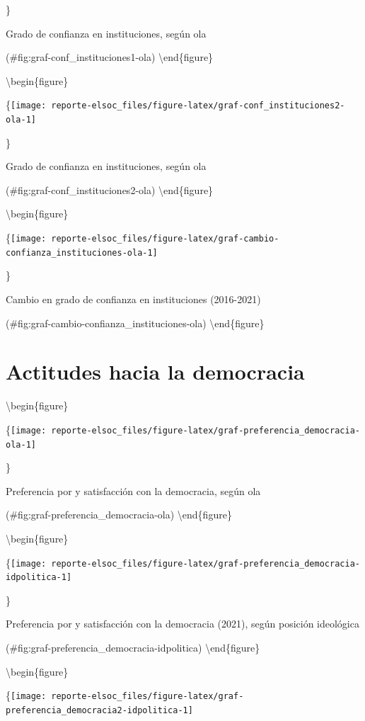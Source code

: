 \documentclass[
  12pt,
]{book}
\begin{document}
\}

\caption{Grado de confianza en instituciones, según ola}

(\#fig:graf-conf\_instituciones1-ola)
\textbackslash end\{figure\}

\textbackslash begin\{figure\}

\{\centering \texttt{[image: reporte-elsoc\_files/figure-latex/graf-conf\_instituciones2-ola-1]}

\}

\caption{Grado de confianza en instituciones, según ola}

(\#fig:graf-conf\_instituciones2-ola)
\textbackslash end\{figure\}

\textbackslash begin\{figure\}

\{\centering \texttt{[image: reporte-elsoc\_files/figure-latex/graf-cambio-confianza\_instituciones-ola-1]}

\}

\caption{Cambio en grado de confianza en instituciones (2016-2021)}

(\#fig:graf-cambio-confianza\_instituciones-ola)
\textbackslash end\{figure\}

\hypertarget{actitudes-hacia-la-democracia}{%
\section{Actitudes hacia la democracia}\label{actitudes-hacia-la-democracia}}

\textbackslash begin\{figure\}

\{\centering \texttt{[image: reporte-elsoc\_files/figure-latex/graf-preferencia\_democracia-ola-1]}

\}

\caption{Preferencia por y satisfacción con la democracia, según ola}

(\#fig:graf-preferencia\_democracia-ola)
\textbackslash end\{figure\}

\textbackslash begin\{figure\}

\{\centering \texttt{[image: reporte-elsoc\_files/figure-latex/graf-preferencia\_democracia-idpolitica-1]}

\}

\caption{Preferencia por y satisfacción con la democracia (2021), según posición ideológica}

(\#fig:graf-preferencia\_democracia-idpolitica)
\textbackslash end\{figure\}

\textbackslash begin\{figure\}

\{\centering \texttt{[image: reporte-elsoc\_files/figure-latex/graf-preferencia\_democracia2-idpolitica-1]}
\end{document}
